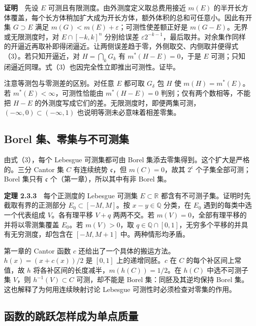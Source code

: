 \documentclass[11pt,a4paper]{article}
\begin{document}
\textbf{证明}　先设 \(E\) 可测且有限测度。由外测度定义取总费用接近 \(m(E)\) 的半开长方体覆盖，每个长方体稍加扩大成为开长方体，额外体积的总和可任意小。因此有开集 \(G\supset E\) 满足 \(m(G)<m(E)+\varepsilon\)；可测性使差额正好是 \(m(G-E)\)。无界或无限测度时，对 \(E\cap[-k,k]^n\) 分别给误差 \(\varepsilon 2^{-k-1}\)，最后取并。对余集作同样的开逼近再取补即得闭逼近。让两侧误差趋于零，外侧取交、内侧取并便得式（3）。若只知开逼近，对 \(H=\bigcap_k G_k\) 有 \(m^*(H-E)=0\)，于是 \(E\) 可测；只知闭逼近同理。式（3）也因完全性立即推出可测性。证毕。

注意等测包与零测差的区别。对任意 \(E\) 都可取 \(G_\delta\) 包 \(H\) 使 \(m(H)=m^*(E)\)。若 \(m^*(E)<\infty\)，可测性恰能由 \(m^*(H-E)=0\) 判别；仅有两个数相等，不能把 \(H-E\) 的外测度写成它们的差。无限测度时，即便两集可测，\((-\infty,0)\subset(-\infty,1)\) 也说明等测未必意味着相差零集。

\subsection*{Borel 集、零集与不可测集}\label{borel-ux96c6ux96f6ux96c6ux4e0eux4e0dux53efux6d4bux96c6}

由式（3），每个 Lebesgue 可测集都可由 Borel 集添去零集得到。这个扩大是严格的。三分 Cantor 集 \(C\) 有连续统势 \(\mathfrak c\)，但 \(m(C)=0\)，故其 \(2^{\mathfrak c}\) 个子集全部可测；Borel 集只有 \(\mathfrak c\) 个（第一章），所以其中有非 Borel 集。

\textbf{定理 2.3.3}　每个正测度的 Lebesgue 可测集 \(E\subset\mathbb R\) 都含有不可测子集。证明时先截取有界的正测部分 \(E_0\subset[-M,M]\)。按 \(x-y\in\mathbb Q\) 分类，在 \(E_0\) 遇到的每类中选一个代表组成 \(V\)。各有理平移 \(V+q\) 两两不交。若 \(m(V)=0\)，全部有理平移的并将以零测集覆盖 \(E_0\)。若 \(m(V)>0\)，取 \(q\in\mathbb Q\cap[0,1]\)，无穷多个平移的并具有无穷测度，却包含在 \([-M,M+1]\) 中。两种情形均矛盾。

第一章的 Cantor 函数 \(c\) 还给出了一个具体的搬运方法。\(h(x)=(x+c(x))/2\) 是 \([0,1]\) 上的递增同胚。\(c\) 在 \(C\) 的每个补区间上常值，故 \(h\) 将各补区间的长度减半，\(m(h(C))=1/2\)。在 \(h(C)\) 中选不可测子集 \(V\)，则 \(h^{-1}(V)\subset C\) 可测，却不能是 Borel 集：同胚及其逆均保持 Borel 集。这也解释了为何用连续映射讨论 Lebesgue 可测性时必须检查对零集的作用。

\subsection*{函数的跳跃怎样成为单点质量}\label{ux51fdux6570ux7684ux8df3ux8dc3ux600eux6837ux6210ux4e3aux5355ux70b9ux8d28ux91cf}
\end{document}
